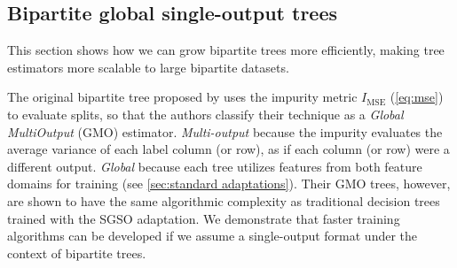 \subsection{Bipartite global single-output trees}
\label{sec:bgso_trees}

This section shows how we can grow bipartite trees more efficiently, making tree estimators more scalable to large bipartite datasets.

The original bipartite tree proposed by  uses the impurity metric $I_\text{MSE}$ (\autoref{eq:mse}) to evaluate splits, so that the authors classify their technique as a \emph{Global MultiOutput} (GMO) estimator. \emph{Multi-output} because the impurity evaluates the average variance of each label column (or row), as if each column (or row) were a different output. \emph{Global} because each tree utilizes features from both feature domains for training (see \autoref{sec:standard adaptations}).
Their GMO trees, however, are shown to have the same algorithmic complexity as traditional decision trees trained with the SGSO adaptation. We demonstrate that faster training algorithms can be developed if we assume a single-output format under the context of bipartite trees. %

